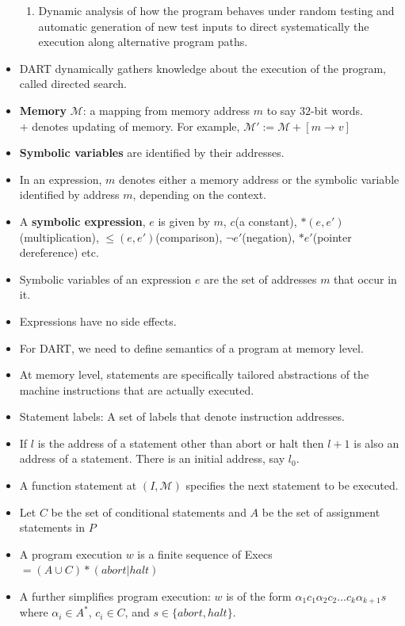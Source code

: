\documentclass[a4paper]{article}
\begin{document}
\begin{itemize}
\begin{enumerate}
        \item Dynamic analysis of how the program behaves under random testing and automatic generation of new test inputs to direct systematically the execution along alternative program paths.
    \end{enumerate}
    \item DART dynamically gathers knowledge about the execution of the program, called directed search.
    \item \textbf{Memory} $\mathcal{M}$: a mapping from memory address $m$ to say $32$-bit words.\\
    $+$ denotes updating of memory. For example, $\mathcal{M}':=\mathcal{M}+[m\to v]$
    \item \textbf{Symbolic variables} are identified by their addresses.
    \item In an expression, $m$ denotes either a memory address or the symbolic variable identified by address $m$, depending on the context.
    \item A \textbf{symbolic expression}, $e$ is given by $m$, $c$(a constant), $\ast(e,e')$(multiplication), $\leq (e,e')$(comparison), $\lnot e'$(negation), $\ast e'$(pointer dereference) etc.
    \item Symbolic variables of an expression $e$ are the set of addresses $m$ that occur in it.
    \item Expressions have no side effects.
    \item For DART, we need to define semantics of a program at memory level.
    \item At memory level, statements are specifically tailored abstractions of the machine instructions that are actually executed.
    \item Statement labels: A set of labels that denote instruction addresses.
    \item If $l$ is the address of a statement other than abort or halt then $l+1$ is also an address of a statement. There is an initial address, say $l_0$.
    \item A function statement at $(I,\mathcal{M})$ specifies the next statement to be executed.
    \item Let $C$ be the set of conditional statements and $A$ be the set of assignment statements in $P$
    \item A program execution $w$ is a finite sequence of Execs $=(A\cup C)\ast (abort|halt)$
    \item A further simplifies program execution: $w$ is of the form $\alpha_1c_1\alpha_2c_2...c_k\alpha_{k+1}s$ where $\alpha_i\in A^*$, $c_i\in C$, and $s\in \{abort, halt\}$.

\end{itemize}
\end{document}

